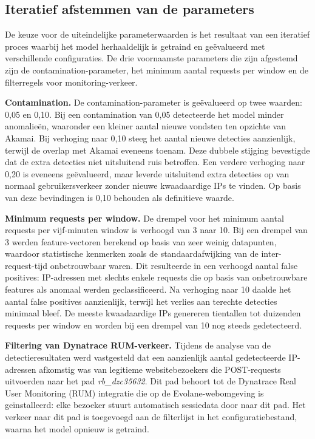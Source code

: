 \subsection{Iteratief afstemmen van de parameters}
\label{subsec:iteratief-afstemmen}
 
De keuze voor de uiteindelijke parameterwaarden is het resultaat van een iteratief proces waarbij het model herhaaldelijk is getraind en geëvalueerd met verschillende configuraties. De drie voornaamste parameters die zijn afgestemd zijn de contamination-parameter, het minimum aantal requests per window en de filterregels voor monitoring-verkeer.
 
\textbf{Contamination.} De contamination-parameter is geëvalueerd op twee waarden: 0,05 en 0,10. Bij een contamination van 0,05 detecteerde het model minder anomalieën, waaronder een kleiner aantal nieuwe vondsten ten opzichte van Akamai. Bij verhoging naar 0,10 steeg het aantal nieuwe detecties aanzienlijk, terwijl de overlap met Akamai eveneens toenam. Deze dubbele stijging bevestigde dat de extra detecties niet uitsluitend ruis betroffen. Een verdere verhoging naar 0,20 is eveneens geëvalueerd, maar leverde uitsluitend extra detecties op van normaal gebruikersverkeer zonder nieuwe kwaadaardige IPs te vinden. Op basis van deze bevindingen is 0,10 behouden als definitieve waarde.
 
\textbf{Minimum requests per window.} De drempel voor het minimum aantal requests per vijf-minuten window is verhoogd van 3 naar 10. Bij een drempel van 3 werden feature-vectoren berekend op basis van zeer weinig datapunten, waardoor statistische kenmerken zoals de standaardafwijking van de inter-request-tijd onbetrouwbaar waren. Dit resulteerde in een verhoogd aantal false positives: IP-adressen met slechts enkele requests die op basis van onbetrouwbare features als anomaal werden geclassificeerd. Na verhoging naar 10 daalde het aantal false positives aanzienlijk, terwijl het verlies aan terechte detecties minimaal bleef. De meeste kwaadaardige IPs genereren tientallen tot duizenden requests per window en worden bij een drempel van 10 nog steeds gedetecteerd.
 
\textbf{Filtering van Dynatrace RUM-verkeer.} Tijdens de analyse van de detectieresultaten werd vastgesteld dat een aanzienlijk aantal gedetecteerde IP-adressen afkomstig was van legitieme websitebezoekers die POST-requests uitvoerden naar het pad \textit{rb\_dzc35632}. Dit pad behoort tot de Dynatrace Real User Monitoring (RUM) integratie die op de Evolane-webomgeving is geïnstalleerd: elke bezoeker stuurt automatisch sessiedata door naar dit pad. Het verkeer naar dit pad is toegevoegd aan de filterlijst in het configuratiebestand, waarna het model opnieuw is getraind.

